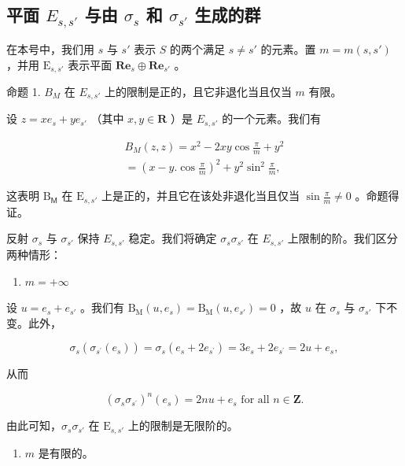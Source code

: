 \subsection{\texorpdfstring{平面 \(E_{s,s'}\) 与由 \(\sigma_{s}\) 和 \(\sigma_{s'}\) 生成的群}{平面 E\_s,s' 与由 sigma\_s 和 sigma\_s' 生成的群}}

在本号中，我们用 \(s\) 与 \(s'\) 表示 \(S\) 的两个满足 \(s \neq s'\) 的元素。置 \(m = m(s, s')\) ，并用 \(\mathrm{E}_{s,s'}\) 表示平面 \(\mathbf{Re}_s \oplus \mathbf{Re}_{s'}\) 。

命题 1. \(B_{M}\) 在 \(E_{s,s'}\) 上的限制是正的，且它非退化当且仅当 \(m\) 有限。

设 \(z = xe_{s} + ye_{s'}\) （其中 \(x, y \in \mathbf{R}\) ）是 \(E_{s,s'}\) 的一个元素。我们有

\[
\begin{array}{r} B _ {M} (z, z) = x ^ {2} - 2 x y \cos \frac {\pi}{m} + y ^ {2} \\ = (x - y. \cos \frac {\pi}{m}) ^ {2} + y ^ {2} \sin^ {2} \frac {\pi}{m}, \end{array}
\]

这表明 \(\mathrm{B}_{\mathsf{M}}\) 在 \(\mathrm{E}_{s,s'}\) 上是正的，并且它在该处非退化当且仅当 \(\sin \frac{\pi}{m} \neq 0\) 。命题得证。

反射 \(\sigma_{s}\) 与 \(\sigma_{s'}\) 保持 \(E_{s,s'}\) 稳定。我们将确定 \(\sigma_{s}\sigma_{s'}\) 在 \(E_{s,s'}\) 上限制的阶。我们区分两种情形：

\begin{enumerate}
\def\labelenumi{\alph{enumi})}
\tightlist
\item
  \(m = +\infty\)
\end{enumerate}

设 \(u = e_s + e_{s'}\) 。我们有 \(\mathrm{B}_{\mathrm{M}}(u, e_s) = \mathrm{B}_{\mathrm{M}}(u, e_{s'}) = 0\) ，故 \(u\) 在 \(\sigma_s\) 与 \(\sigma_{s'}\) 下不变。此外，

\[
\sigma_ {s} \left(\sigma_ {s ^ {\prime}} \left(e _ {s}\right)\right) = \sigma_ {s} \left(e _ {s} + 2 e _ {s ^ {\prime}}\right) = 3 e _ {s} + 2 e _ {s ^ {\prime}} = 2 u + e _ {s},
\]

从而

\[
\left(\sigma_ {s} \sigma_ {s ^ {\prime}}\right) ^ {n} \left(e _ {s}\right) = 2 n u + e _ {s} \text {   for   all   } n \in \mathbf {Z}.
\]

由此可知，\(\sigma_s\sigma_{s'}\) 在 \(\mathrm{E}_{s,s'}\) 上的限制是无限阶的。

\begin{enumerate}
\def\labelenumi{\alph{enumi})}
\setcounter{enumi}{1}
\tightlist
\item
  \(m\) 是有限的。
\end{enumerate}

